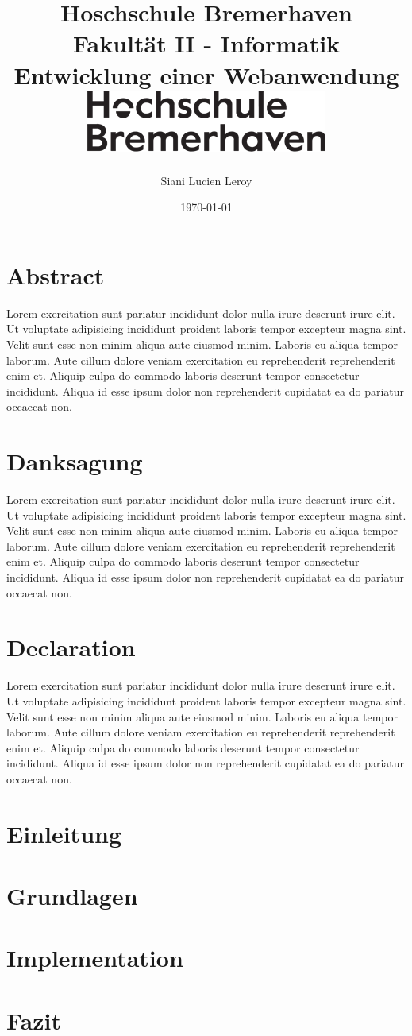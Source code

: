 \documentclass[12pt, twoside]{report}
\title{
    {\LARGE Hoschschule Bremerhaven}\\
    {\large Fakultät II - Informatik}\\
    {Entwicklung einer Webanwendung}\\
    {\includegraphics{images/hs-logo.png}}
}
\author{Siani Lucien Leroy}
\date{\today}
\newcommand{\lorem}{Lorem exercitation sunt pariatur incididunt dolor nulla irure deserunt irure elit. Ut voluptate adipisicing incididunt proident laboris tempor excepteur magna sint. Velit sunt esse non minim aliqua aute eiusmod minim. Laboris eu aliqua tempor laborum. Aute cillum dolore veniam exercitation eu reprehenderit reprehenderit enim et. Aliquip culpa do commodo laboris deserunt tempor consectetur incididunt. Aliqua id esse ipsum dolor non reprehenderit cupidatat ea do pariatur occaecat non.}
\begin{document}
\maketitle


\chapter*{Abstract}
\lorem

\chapter*{Danksagung}
\lorem

\chapter*{Declaration}
\lorem

\tableofcontents

\chapter{Einleitung}


\chapter{Grundlagen}


\chapter{Implementation}


\chapter{Fazit}

\end{document}
